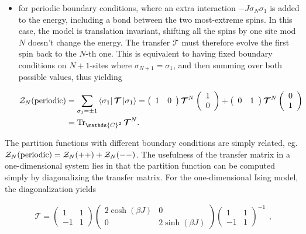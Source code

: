 \documentclass{homework}
\begin{document}
\begin{itemize}
    \item for periodic boundary conditions, where an extra interaction $-J \sigma_N \sigma_1$ is added to the energy, including a bond between the two most-extreme spins. In this case, the model is translation invariant, shifting all the spins by one site mod $N$ doesn't change the energy. The transfer $\bm{\mathcal{T}}$ must therefore evolve the first spin back to the $N$-th one. This is equivalent to having fixed boundary conditions on $N+1$-sites where $\sigma_{N+1} = \sigma_1$, and then summing over both possible values, thus yielding 
    
    \begin{equation}
    \begin{split}
    \mathcal{Z}_N(\textnormal{periodic}) &= \sum_{\sigma_1 = \pm 1} \bra{\sigma_1} \bm{\mathcal{T}} \ket{\sigma_1} =  \left(\begin{array}{cc}
        1 & 0 \\
    \end{array}\right) \bm{\mathcal{T}}^{N} \left(\begin{array}{c}
        1 \\
        0 
    \end{array}\right) +  \left(\begin{array}{cc}
        0 & 1 \\
    \end{array}\right) \bm{\mathcal{T}}^{N} \left(\begin{array}{c}
        0 \\
        1 
    \end{array}\right) \\
    &= \Tr_{\mathds{C}^2} \bm{\mathcal{T}}^{N}.
    \end{split}
    \end{equation}
\end{itemize}

The partition functions with different boundary conditions are simply related, eg. $\mathcal{Z}_N(\textnormal{periodic}) = \mathcal{Z}_N(++) + \mathcal{Z}_N(--)$. The usefulness of the transfer matrix in a one-dimensional system lies in that the partition function can be computed simply by diagonalizing the transfer matrix. For the one-dimensional Ising model, the diagonalization yields  

\begin{equation}
    \begin{split}
    \bm{\mathcal{T}} = \left(\begin{array}{cc}
        1 & 1 \\
        -1 & 1 
    \end{array}\right)\left(\begin{array}{cc}
        2\cosh(\beta J) & 0 \\
        0 & 2\sinh(\beta J)
    \end{array}\right) \left(\begin{array}{cc}
        1 & 1 \\
        -1 & 1 
    \end{array}\right)^{-1}
    \end{split},
    \label{Ising model - T matrix diag}
\end{equation}
\end{document}
